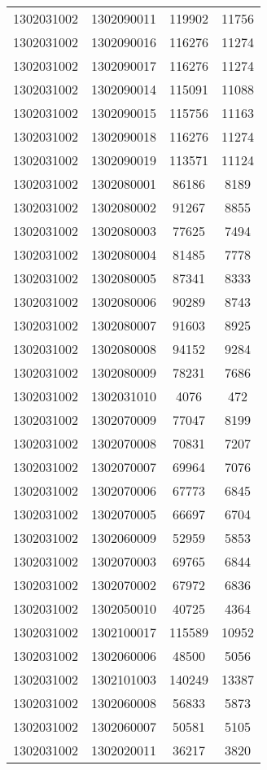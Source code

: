 \begin{longtable}[h]{llcc}
		1302031002 & 1302090011 & 119902 & 11756\\
		1302031002 & 1302090016 & 116276 & 11274\\
		1302031002 & 1302090017 & 116276 & 11274\\
		1302031002 & 1302090014 & 115091 & 11088\\
		1302031002 & 1302090015 & 115756 & 11163\\
		1302031002 & 1302090018 & 116276 & 11274\\
		1302031002 & 1302090019 & 113571 & 11124\\
		1302031002 & 1302080001 & 86186 & 8189\\
		1302031002 & 1302080002 & 91267 & 8855\\
		1302031002 & 1302080003 & 77625 & 7494\\
		1302031002 & 1302080004 & 81485 & 7778\\
		1302031002 & 1302080005 & 87341 & 8333\\
		1302031002 & 1302080006 & 90289 & 8743\\
		1302031002 & 1302080007 & 91603 & 8925\\
		1302031002 & 1302080008 & 94152 & 9284\\
		1302031002 & 1302080009 & 78231 & 7686\\
		1302031002 & 1302031010 & 4076 & 472\\
		1302031002 & 1302070009 & 77047 & 8199\\
		1302031002 & 1302070008 & 70831 & 7207\\
		1302031002 & 1302070007 & 69964 & 7076\\
		1302031002 & 1302070006 & 67773 & 6845\\
		1302031002 & 1302070005 & 66697 & 6704\\
		1302031002 & 1302060009 & 52959 & 5853\\
		1302031002 & 1302070003 & 69765 & 6844\\
		1302031002 & 1302070002 & 67972 & 6836\\
		1302031002 & 1302050010 & 40725 & 4364\\
		1302031002 & 1302100017 & 115589 & 10952\\
		1302031002 & 1302060006 & 48500 & 5056\\
		1302031002 & 1302101003 & 140249 & 13387\\
		1302031002 & 1302060008 & 56833 & 5873\\
		1302031002 & 1302060007 & 50581 & 5105\\
		1302031002 & 1302020011 & 36217 & 3820\\

\end{longtable}

